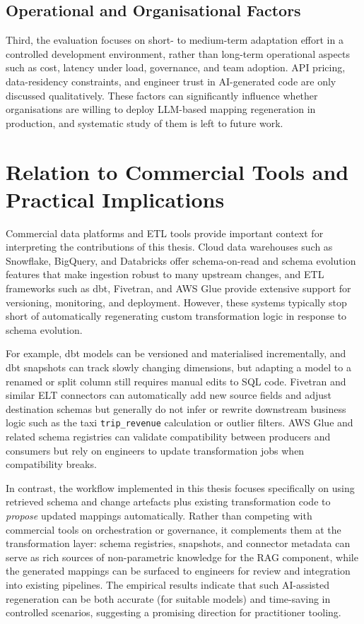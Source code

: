 \subsection{Operational and Organisational Factors}

Third, the evaluation focuses on short- to medium-term adaptation effort in a controlled development environment, rather than long-term operational aspects such as cost, latency under load, governance, and team adoption. API pricing, data-residency constraints, and engineer trust in AI-generated code are only discussed qualitatively. These factors can significantly influence whether organisations are willing to deploy LLM-based mapping regeneration in production, and systematic study of them is left to future work.


\section{Relation to Commercial Tools and Practical Implications}
\label{sec:discussion-commercial}

Commercial data platforms and ETL tools provide important context for interpreting the contributions of this thesis. Cloud data warehouses such as Snowflake, BigQuery, and Databricks offer schema-on-read and schema evolution features that make ingestion robust to many upstream changes, and ETL frameworks such as dbt, Fivetran, and AWS Glue provide extensive support for versioning, monitoring, and deployment. However, these systems typically stop short of automatically regenerating custom transformation logic in response to schema evolution.

For example, dbt models can be versioned and materialised incrementally, and dbt snapshots can track slowly changing dimensions, but adapting a model to a renamed or split column still requires manual edits to SQL code. Fivetran and similar ELT connectors can automatically add new source fields and adjust destination schemas but generally do not infer or rewrite downstream business logic such as the taxi \texttt{trip\_revenue} calculation or outlier filters. AWS Glue and related schema registries can validate compatibility between producers and consumers but rely on engineers to update transformation jobs when compatibility breaks.

In contrast, the workflow implemented in this thesis focuses specifically on using retrieved schema and change artefacts plus existing transformation code to \emph{propose} updated mappings automatically. Rather than competing with commercial tools on orchestration or governance, it complements them at the transformation layer: schema registries, snapshots, and connector metadata can serve as rich sources of non-parametric knowledge for the RAG component, while the generated mappings can be surfaced to engineers for review and integration into existing pipelines. The empirical results indicate that such AI-assisted regeneration can be both accurate (for suitable models) and time-saving in controlled scenarios, suggesting a promising direction for practitioner tooling.


